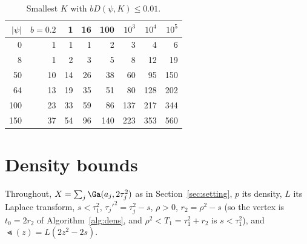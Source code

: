 \begin{table}[h]\centering\small
\caption{Smallest $K$ with $bD(\psi,K)\le0.01$.}\label{tab:K}
\begin{tabular}{rrrrrrrr}\toprule
$|\psi|$ & $b=0.2$ & 1 & 16 & 100 & $10^3$ & $10^4$ & $10^5$\\\midrule
0 & 1 & 1 & 1 & 2 & 3 & 4 & 6\\
8 & 1 & 2 & 3 & 5 & 8 & 12 & 19\\
50 & 10 & 14 & 26 & 38 & 60 & 95 & 150\\
64 & 13 & 19 & 35 & 51 & 80 & 128 & 202\\
100 & 23 & 33 & 59 & 86 & 137 & 217 & 344\\
150 & 37 & 54 & 96 & 140 & 223 & 353 & 560\\\bottomrule
\end{tabular}
\end{table}

\section{Density bounds}\label{sec:dens}

Throughout, $X=\sum_j\Ga(a_j,2\tau_j^2)$ as in Section~\ref{sec:setting}, $p$ its density, $L$ its Laplace
transform, $s<\tau_1^2$, $\tau_j'^2=\tau_j^2-s$, $\rho>0$, $r_2=\rho^2-s$ (so the vertex is $t_0=2r_2$ of
Algorithm~\ref{alg:dens}, and $\rho^2<T_1=\tau_1^2+r_2$ is $s<\tau_1^2$), and $\Lt(z)=L(2z^2-2s)$.

